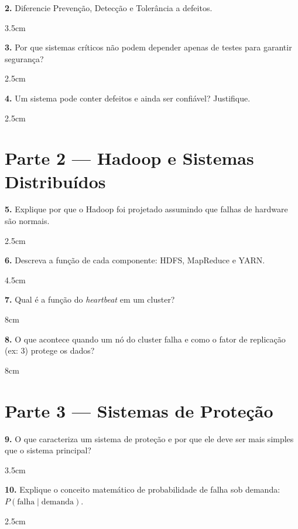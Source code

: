\documentclass[12pt,a4paper]{report}
\begin{document}
\textbf{2.} Diferencie Prevenção, Detecção e Tolerância a defeitos.
\begin{resposta}{3.5cm}
\end{resposta}

\textbf{3.} Por que sistemas críticos não podem depender apenas de testes para garantir segurança?
\begin{resposta}{2.5cm}
\end{resposta}

\textbf{4.} Um sistema pode conter defeitos e ainda ser confiável? Justifique.
\begin{resposta}{2.5cm}
\end{resposta}

\newpage

\section*{Parte 2 — Hadoop e Sistemas Distribuídos}

\textbf{5.} Explique por que o Hadoop foi projetado assumindo que falhas de hardware são normais.
\begin{resposta}{2.5cm}
\end{resposta}

\textbf{6.} Descreva a função de cada componente: HDFS, MapReduce e YARN.
\begin{resposta}{4.5cm}
\end{resposta}

\textbf{7.} Qual é a função do \textit{heartbeat} em um cluster?
\begin{resposta}{8cm}
\end{resposta}

\textbf{8.} O que acontece quando um nó do cluster falha e como o fator de replicação (ex: 3) protege os dados?
\begin{resposta}{8cm}
\end{resposta}

\section*{Parte 3 — Sistemas de Proteção}

\textbf{9.} O que caracteriza um sistema de proteção e por que ele deve ser mais simples que o sistema principal?
\begin{resposta}{3.5cm}
\end{resposta}

\textbf{10.} Explique o conceito matemático de probabilidade de falha sob demanda: $P(\text{falha} \mid \text{demanda})$.
\begin{resposta}{2.5cm}
\end{resposta}
\end{document}
